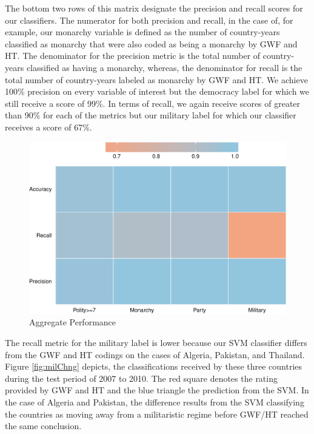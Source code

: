 \documentclass[pdftex,12pt,fullpage,oneside]{amsart}
\begin{document}
The bottom two rows of this matrix designate the precision and recall scores for our classifiers. The numerator for both precision and recall, in the case of, for example, our monarchy variable is defined as the number of country-years classified as monarchy that were also coded as being a monarchy by GWF and HT. The denominator for the precision metric is the total number of country-years classified as having a monarchy, whereas, the denominator for recall is the total number of country-years labeled as monarchy by GWF and HT. We achieve 100\% precision on every variable of interest but the democracy label for which we still receive a score of 99\%. In terms of recall, we again receive scores of greater than 90\% for each of the metrics but our military label for which our classifier receives a score of 67\%. 


\begin{figure}[ht]
	\centering
	\includegraphics[width=.7\textwidth]{allAggPerf}	
	\caption{Aggregate Performance}
	\label{fig:aggPerf}
\end{figure}
\FloatBarrier

The recall metric for the military label is lower because our SVM classifier differs from the GWF and HT codings on the cases of Algeria, Pakistan, and Thailand. Figure \ref{fig:milChng} depicts, the classifications received by these three countries during the test period of 2007 to 2010. The red square denotes the rating provided by GWF and HT and the blue triangle the prediction from the SVM. In the case of Algeria and Pakistan, the difference results from the SVM classifying the countries as moving away from a militaristic regime before GWF/HT reached the same conclusion. 
\end{document}
